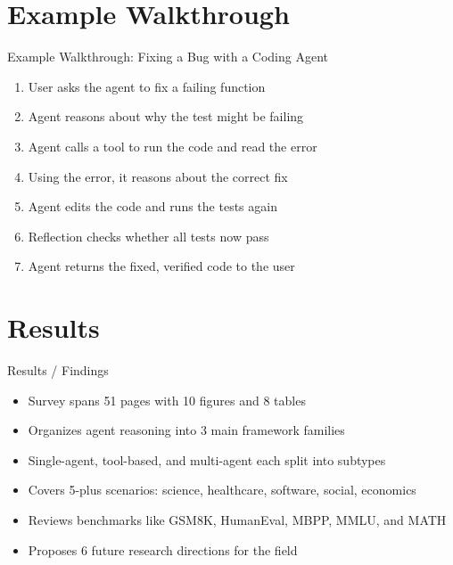 \documentclass[10pt]{beamer}
\begin{document}
\section{Example Walkthrough}
\begin{frame}[allowframebreaks]{Example Walkthrough: Fixing a Bug with a Coding Agent}
\begin{enumerate}
  \item User asks the agent to fix a failing function
  \item Agent reasons about why the test might be failing
  \item Agent calls a tool to run the code and read the error
  \item Using the error, it reasons about the correct fix
  \item Agent edits the code and runs the tests again
  \item Reflection checks whether all tests now pass
  \item Agent returns the fixed, verified code to the user
\end{enumerate}
\end{frame}
\section{Results}
\begin{frame}[allowframebreaks]{Results / Findings}
\begin{itemize}
  \item Survey spans 51 pages with 10 figures and 8 tables
  \item Organizes agent reasoning into 3 main framework families
  \item Single-agent, tool-based, and multi-agent each split into subtypes
  \item Covers 5-plus scenarios: science, healthcare, software, social, economics
  \item Reviews benchmarks like GSM8K, HumanEval, MBPP, MMLU, and MATH
  \item Proposes 6 future research directions for the field
\end{itemize}
\end{frame}
\end{document}
